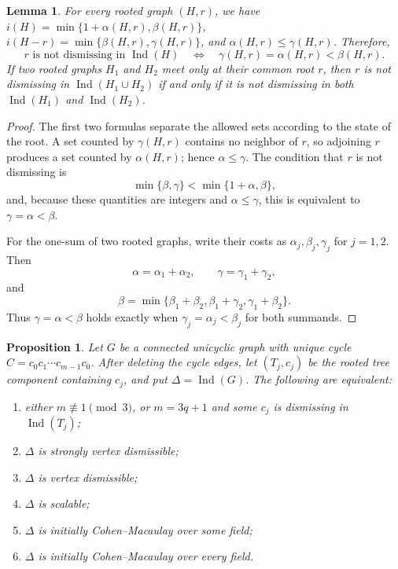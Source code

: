 \documentclass[11pt]{amsart}
\DeclareMathOperator{\Ind}{Ind}
\newtheorem{lemma}[theorem]{Lemma}
\newtheorem{proposition}[theorem]{Proposition}
\theoremstyle{definition}
\begin{document}
	\begin{lemma}\label{lem:7}
		For every rooted graph $(H,r)$, we have $i(H)=\min\{1+\alpha(H,r),\beta(H,r)\}$, $i(H-r)=\min\{\beta(H,r),\gamma(H,r)\}$, and $\alpha(H,r)\leq \gamma(H,r)$.  Therefore,
		\[
		r\text{ is not dismissing in }\Ind(H)
		\quad\Longleftrightarrow\quad
		\gamma(H,r)=\alpha(H,r)<\beta(H,r).
		\]
		If two rooted graphs $H_1$ and $H_2$ meet only at their common root $r$, then $r$ is not dismissing in $\Ind(H_1\cup H_2)$ if and only if it is not dismissing in both $\Ind(H_1)$ and $\Ind(H_2)$.
	\end{lemma}
	
	\begin{proof}
		The first two formulas separate the allowed sets according to the state of the root. A set counted by $\gamma(H,r)$ contains no neighbor of $r$, so adjoining $r$ produces a set counted by $\alpha(H,r)$; hence $\alpha\leq\gamma$.  The condition that $r$ is not dismissing is
		\[
		\min\{\beta,\gamma\}<\min\{1+\alpha,\beta\},
		\]
		and, because these quantities are integers and $\alpha\leq\gamma$, this is equivalent to $\gamma=\alpha<\beta$.
		
		For the one-sum of two rooted graphs, write their costs as $\alpha_j,\beta_j,\gamma_j$ for $j=1,2$.  Then
		\[
		\alpha=\alpha_1+\alpha_2,
		\qquad
		\gamma=\gamma_1+\gamma_2,
		\]
		and
		\[
		\beta=\min\{\beta_1+\beta_2,\beta_1+\gamma_2,\gamma_1+\beta_2\}.
		\]
		Thus $\gamma=\alpha<\beta$ holds exactly when $\gamma_j=\alpha_j<\beta_j$ for both summands.
	\end{proof}
	
	\begin{proposition}\label{prop:7}
		Let $G$ be a connected unicyclic graph with unique cycle $C=c_0c_1\cdots c_{m-1}c_0$. After deleting the cycle edges, let $(T_j,c_j)$ be the rooted tree component containing $c_j$, and put $\Delta=\Ind(G)$.  The following are equivalent:
		\begin{enumerate}[label=\textup{(\roman*)}]
			\item either $m\not\equiv1\pmod3$, or $m=3q+1$ and some $c_j$ is dismissing in $\Ind(T_j)$;
			\item $\Delta$ is strongly vertex dismissible;
			\item $\Delta$ is vertex dismissible;
			\item $\Delta$ is scalable;
			\item $\Delta$ is initially Cohen--Macaulay over some field;
			\item $\Delta$ is initially Cohen--Macaulay over every field.
		\end{enumerate}
	\end{proposition}
	
\end{document}
